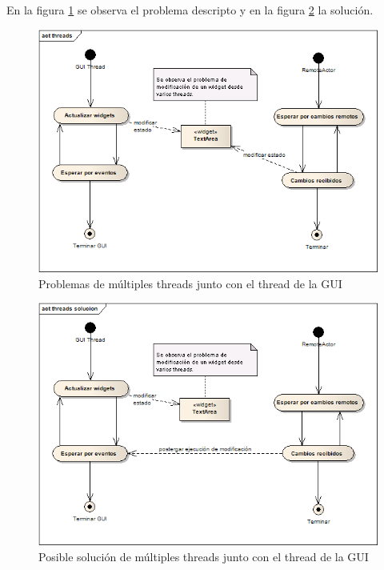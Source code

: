 \documentclass[12pt,a4paper]{article}
\begin{document}
En la figura \ref{threads-gui} se observa el problema descripto y en la figura \ref{threads-gui-solucion} la solución.

	\begin{figure}[!ht]
		\begin{center}
			\includegraphics[width=14cm]{threads-gui.png}
			\caption{\label{threads-gui} Problemas de múltiples threads junto con el thread de la GUI }
		\end{center}
	\end{figure}


	\begin{figure}[!ht]
		\begin{center}
			\includegraphics[width=14cm]{threads-gui-solucion.png}
			\caption{\label{threads-gui-solucion} Posible solución de múltiples threads junto con el thread de la GUI }
		\end{center}
	\end{figure}
\end{document}
